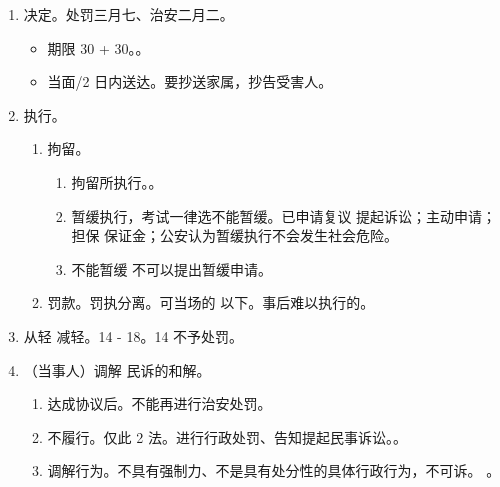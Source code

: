\begin{enumerate}
\begin{enumerate}
\begin{enumerate}
\begin{enumerate}
                        \end{enumerate}
                  \item 检查。
                        \begin{enumerate}
                          \item 两个人两个证。工作证件、县以上公安开具的检查证明。情况紧急出示工作证件即可。
                          \item 检查公民住宅，必须两证齐全。
                          \item 调查阶段，为核对证据可进行扣押（\bdy 没收）。
                        \end{enumerate}
                \end{enumerate}
          \item 决定。处罚三月七、治安二月二。
                \begin{itemize}
                  \item 期限 30 + 30。。
                  \item 当面/2 日内送达。要抄送家属，抄告受害人。
                \end{itemize}
          \item 执行。
                \begin{enumerate}
                  \item 拘留。
                        \begin{enumerate}
                          \item 拘留所执行。。
                          \item 暂缓执行，考试一律选不能暂缓。已申请复议 \hz 提起诉讼；主动申请；担保 \hz 保证金；公安认为暂缓执行不会发生社会危险。
                          \item 不能暂缓 \bdy 不可以提出暂缓申请。
                        \end{enumerate}
                  \item 罚款。罚执分离。可当场的  以下。\er 事后难以执行的。
                \end{enumerate}
          \item 从轻 \hz 减轻。14 - 18。14 不予处罚。
          \item （当事人）调解 \ydy 民诉的和解。
                \begin{enumerate}
                  \item 达成协议后。不能再进行治安处罚。
                  \item 不履行。仅此 2 法。进行行政处罚、告知提起民事诉讼。。
                  \item 调解行为。不具有强制力、不是具有处分性的具体行政行为，不可诉。
                        。
                \end{enumerate}
        \end{enumerate}
\end{enumerate}
